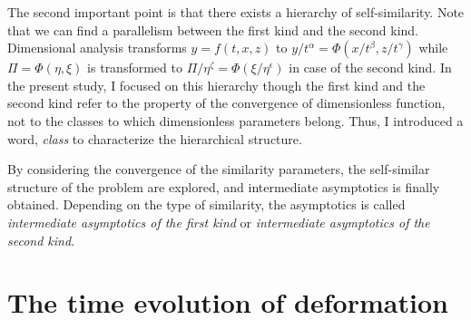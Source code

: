 \documentclass[aps,prl,superscriptaddress]{revtex4}  %
\begin{document}
The second important point is that there exists a hierarchy of self-similarity. Note that we can find a parallelism between the first kind and the second kind. Dimensional analysis transforms $y=f(t,x,z)$ to $y/t^{\alpha} = \Phi(x/t^{\beta}, z/t^{\gamma})$ while $\Pi = \Phi(\eta, \xi)$ is transformed to  $\Pi / \eta^{\zeta} = \Phi( \xi / \eta^{\epsilon} )$ in case of the second kind. In the present study, I focused on this hierarchy though the first kind and the second kind refer to the property of the convergence of dimensionless function, not to the classes to which dimensionless parameters belong. Thus, I introduced a word, {\it class} to characterize the hierarchical structure.

By considering the convergence of the similarity parameters,  the self-similar structure of the problem are explored, and intermediate asymptotics is finally obtained. Depending on the type of similarity, the asymptotics is called {\it intermediate asymptotics of the first kind} or {\it intermediate asymptotics of the second kind}.

\section{The time evolution of deformation}
\end{document}
